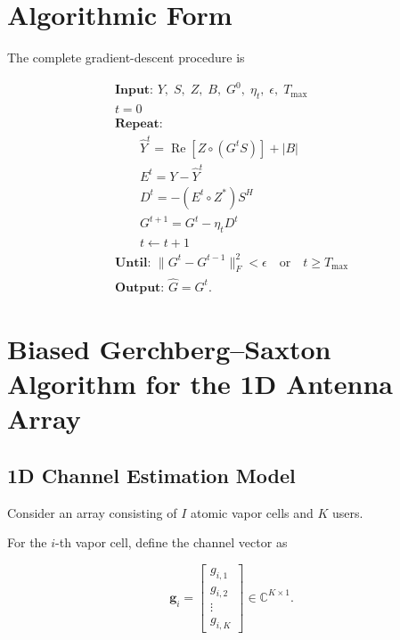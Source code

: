 \documentclass[12pt,a4paper]{article}
\begin{document}
\section{Algorithmic Form}

The complete gradient-descent procedure is

\begin{equation}
\boxed{
\begin{array}{l}
\textbf{Input: }
Y,\;S,\;Z,\;B,\;G^{0},\;\eta_t,\;\epsilon,\;T_{\max}
\\[2mm]
t=0
\\[2mm]
\textbf{Repeat:}
\\
\qquad
\widehat{Y}^{t}
=
\operatorname{Re}
[Z\circ(G^{t}S)]
+
|B|
\\[1mm]
\qquad
E^{t}
=
Y-\widehat{Y}^{t}
\\[1mm]
\qquad
D^{t}
=
-(E^{t}\circ Z^{*})S^{H}
\\[1mm]
\qquad
G^{t+1}
=
G^{t}
-
\eta_tD^{t}
\\[1mm]
\qquad
t\leftarrow t+1
\\[2mm]
\textbf{Until: }
\|G^{t}-G^{t-1}\|_{F}^{2}<\epsilon
\quad
\text{or}
\quad
t\geq T_{\max}
\\[2mm]
\textbf{Output: }
\widehat{G}=G^{t}.
\end{array}
}
\tag{228}
\end{equation}


\section{Biased Gerchberg--Saxton Algorithm for the 1D Antenna Array}
\label{sec:gs}

\subsection{1D Channel Estimation Model}

Consider an array consisting of $I$ atomic vapor cells and $K$ users.

For the $i$-th vapor cell, define the channel vector as

\begin{equation}
\boxed{
\mathbf g_i
=
\begin{bmatrix}
g_{i,1}\\
g_{i,2}\\
\vdots\\
g_{i,K}
\end{bmatrix}
\in
\mathbb C^{K\times 1}
}.
\tag{229}
\end{equation}
\end{document}

